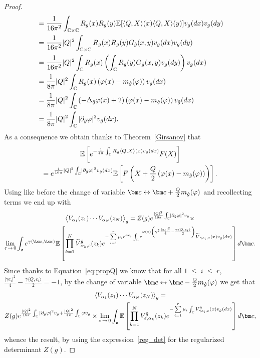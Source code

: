 \documentclass[AHL,Unicode,longabstracts,published]{cedram}
\renewcommand{\tilde}{\widetilde}
\renewcommand{\leq}{\;\leqslant\;}
\newcommand{\frka}{\mathfrak{a}}
\newcommand{\C}{\mathbb{C}}
\newcommand{\E}{\mathbb{E}}
\newcommand{\ps}[1]{\langle #1 \rangle}
\newcommand*\eps{\varepsilon}
\newcommand{\expect}[1]{\mathbb{E}\left[#1\right]}
\let\oldtilde\tilde
\renewcommand*{\tilde}[1]{\mathchoice{\widetilde{#1}}{\widetilde{#1}}{\oldtilde{#1}}{\oldtilde{#1}}}
\let\oldhat\hat
\renewcommand*{\hat}[1]{\mathchoice{\widehat{#1}}{\widehat{#1}}{\oldhat{#1}}{\oldhat{#1}}}
\begin{document}
\begin{proof}
\begin{align*}
& = \frac{1}{16\pi^2} \int_{\C \times \C} R_g(x) R_g(y) \E[\langle Q, X \rangle (x) \langle Q, X \rangle (y)] v_g(dx)v_g(dy) \\
& = \frac{1}{16\pi^2}|Q|^2 \int_{\C \times \C} R_g(x) R_g(y) G_{\hat g}(x,y) v_g(dx)v_g(dy) \\
& = \frac{1}{16\pi^2} |Q|^2 \int_{\C } R_g(x) \left (\int_{\C} R_g(y) G_{\hat g}(x,y)v_g(dy) \right) v_g(dx) \\
& = \frac{1}{8\pi}|Q|^2 \int_{\C } R_g(x) \left(\varphi(x) -m_{\hat g}(\varphi)\right) v_g(dx) \\
& = \frac{1}{8\pi}|Q|^2 \int_{\C } \left(-\Delta_{\hat g} \varphi(x)+2\right) \left(\varphi(x) -m_{\hat g}(\varphi)\right) v_{\hat g}(dx) \\
& = \frac{1}{8\pi} |Q|^2 \int_{\C } |\partial_{\hat{g}} \varphi|^2 v_{\hat{g}}(dx).
\end{align*}
As a consequence we obtain thanks to Theorem~\ref{Girsanov} that
\begin{multline*}
\expect{e^{-\frac{1}{4 \pi} \int_{\C} R_g \langle Q, X \rangle (x) v_g(dx)}F(X)}\\
=e^{\frac{1}{16\pi} |Q|^2 \int_{\C } \left|\partial_{\hat{g}} \varphi\right|^2 v_{\hat{g}}(dx)}\expect{F\left(X+\frac{Q}{2}\left(\varphi(x) -m_{\hat g}(\varphi)\right)\right)}.
\end{multline*}
Using like before the change of variable $\bm c\leftrightarrow\bm c +\frac Q2m_{\hat g}(\varphi)$ and recollecting terms we end up with
\begin{multline*}
\big\langle V_{\alpha_1}(z_1) \cdots V_{\alpha_N}(z_N) \big\rangle _g= Z(g)e^{ \frac{|Q|^2}{16 \pi} \int_{\C } \left|\partial_{\hat{g}} \varphi\right|^2 v_{\hat{g}} } \times\\
\underset{\eps\,\to\,0}{\lim}\int_{\frka} e^{\gamma\ps{\bm s,\bm c}} \E \left [\prod_{k=1}^N \tilde V^{\hat g}_{\alpha_k,\eps}(z_k) e^{ - \sum\limits_{i=1}^{r} \mu_i e^{\gamma c_i} \int_{\C} e^{ \varphi(x) \left(\gamma^2 \frac{|e_i|^2}{4}-\frac{\gamma \langle Q,e_i \rangle }{2}\right) } \tilde V_{\gamma e_i,\eps}(x) v_g(dx) } \right] d\bm c.
\end{multline*}
Since thanks to Equation~\eqref{eq:propQ} we know that for all $1\leq i\leq r$, $\frac{|\gamma e_i|^2}{4}-\frac{\gamma \langle Q,e_i \rangle }{2}=-1$, by the change of variable ${\bm c \leftrightarrow \bm c- \frac{Q}2 m_{\hat g}(\varphi)}$ we get that
\begin{multline*}
\left\langle V_{\alpha_1}(z_1) \cdots V_{\alpha_N}(z_N) \right\rangle _g = \\
Z(g) e^{ \frac{|Q|^2}{16 \pi} \int_{\C } |\partial_{\hat{g}} \varphi|^2 v_{\hat{g}} + \frac{|Q|^2}{4 \pi} \int_{\C } \varphi v_{\hat{g}} } \times \underset{\eps\,\to\,0}{\lim}\int_{\frka} \E \left[\prod_{k=1}^N V^{\hat g}_{\eps, \alpha_k}(z_k) e^{ -\sum\limits_{i=1}^r \mu_i \int_{\C} V^{\hat g}_{\gamma e_i,\eps}(x) v_{\hat{g}}(dx) }\right]d\bm c,
\end{multline*}
whence the result, by using the expression~\eqref{reg_det} for the regularized determinant $Z(g)$.


\end{proof}
\end{document}
